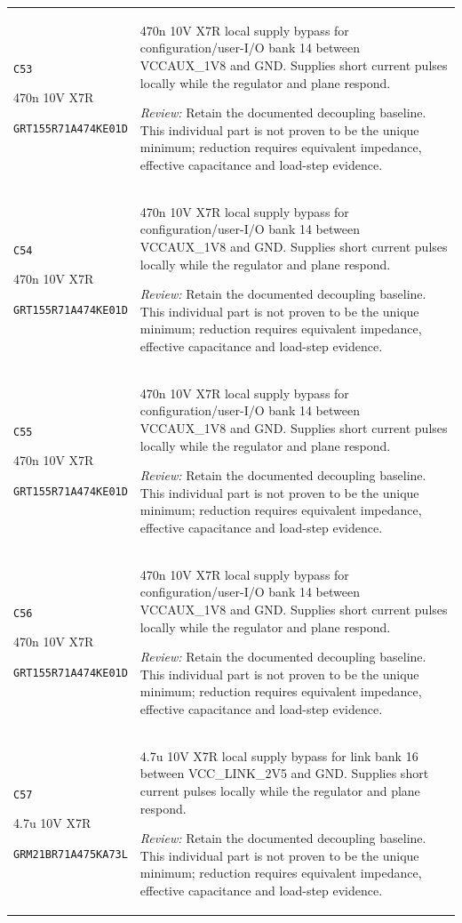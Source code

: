 \documentclass[10pt,a4paper]{article}
\begin{document}
\begin{longtable}{@{}P{46mm}P{117mm}@{}}
\nolinkurl{C53}\par 470n 10V X7R\par\scriptsize \nolinkurl{GRT155R71A474KE01D} & 470n 10V X7R local supply bypass for configuration/user-I/O bank 14 between VCCAUX\_1V8 and GND. Supplies short current pulses locally while the regulator and plane respond.\par\smallskip\textit{Review:} Retain the documented decoupling baseline. This individual part is not proven to be the unique minimum; reduction requires equivalent impedance, effective capacitance and load-step evidence. \\
\nolinkurl{C54}\par 470n 10V X7R\par\scriptsize \nolinkurl{GRT155R71A474KE01D} & 470n 10V X7R local supply bypass for configuration/user-I/O bank 14 between VCCAUX\_1V8 and GND. Supplies short current pulses locally while the regulator and plane respond.\par\smallskip\textit{Review:} Retain the documented decoupling baseline. This individual part is not proven to be the unique minimum; reduction requires equivalent impedance, effective capacitance and load-step evidence. \\
\nolinkurl{C55}\par 470n 10V X7R\par\scriptsize \nolinkurl{GRT155R71A474KE01D} & 470n 10V X7R local supply bypass for configuration/user-I/O bank 14 between VCCAUX\_1V8 and GND. Supplies short current pulses locally while the regulator and plane respond.\par\smallskip\textit{Review:} Retain the documented decoupling baseline. This individual part is not proven to be the unique minimum; reduction requires equivalent impedance, effective capacitance and load-step evidence. \\
\nolinkurl{C56}\par 470n 10V X7R\par\scriptsize \nolinkurl{GRT155R71A474KE01D} & 470n 10V X7R local supply bypass for configuration/user-I/O bank 14 between VCCAUX\_1V8 and GND. Supplies short current pulses locally while the regulator and plane respond.\par\smallskip\textit{Review:} Retain the documented decoupling baseline. This individual part is not proven to be the unique minimum; reduction requires equivalent impedance, effective capacitance and load-step evidence. \\
\nolinkurl{C57}\par 4.7u 10V X7R\par\scriptsize \nolinkurl{GRM21BR71A475KA73L} & 4.7u 10V X7R local supply bypass for link bank 16 between VCC\_LINK\_2V5 and GND. Supplies short current pulses locally while the regulator and plane respond.\par\smallskip\textit{Review:} Retain the documented decoupling baseline. This individual part is not proven to be the unique minimum; reduction requires equivalent impedance, effective capacitance and load-step evidence. \\

\end{longtable}
\end{document}
